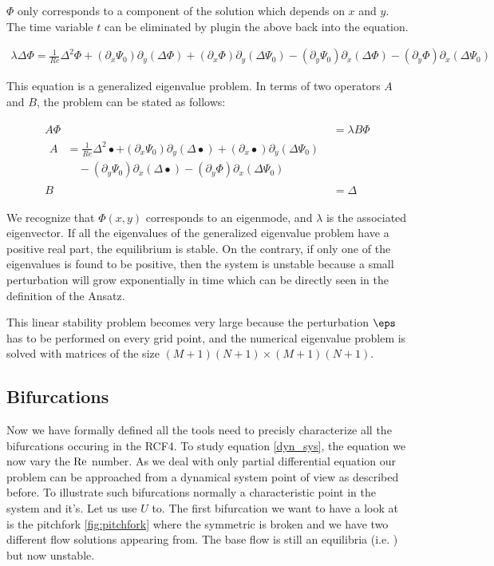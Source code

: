 $\Phi$ only corresponds to a component of the solution which depends on $x$ and
$y$. The time variable $t$ can be eliminated by plugin the above back into the
equation.

\begin{align}
\lambda \Delta \Phi = \frac{1}{Re} \Delta^2 \Phi
  + (\partial_x \Psi_0) \partial_y (\Delta \Phi)
  + (\partial_x \Phi) \partial_y (\Delta \Psi_0)
  - (\partial_y \Psi_0) \partial_x (\Delta \Phi)
  - (\partial_y \Phi) \partial_x (\Delta \Psi_0)
\label{eq:str_phi}
\end{align}

This equation is a generalized eigenvalue problem. In terms of two operators
$A$ and $B$, the problem can be stated as follows: 

\begin{align} \label{eq:eig_prob}
  \begin{split}
  A \Phi & = \lambda B \Phi \\[4pt]
  \begin{split}
  A & = \frac{1}{Re} \Delta^2 \bullet
    + (\partial_x \Psi_0) \partial_y (\Delta \bullet)
    + (\partial_x \bullet) \partial_y (\Delta \Psi_0) \\
    &\quad - (\partial_y \Psi_0) \partial_x (\Delta \bullet)
    - (\partial_y \Phi) \partial_x (\Delta \Psi_0)
  \end{split} \\
  B & = \Delta
  \end{split}
\end{align}

We recognize that $\Phi(x,y)$ corresponds to an eigenmode, and $\lambda$ is the
associated eigenvector. If all the eigenvalues of the generalized eigenvalue
problem have a positive real part, the equilibrium is stable. On the contrary,
if only one of the eigenvalues is found to be positive, then the system is
unstable because a small perturbation will grow exponentially in time which can
be directly seen in the definition of the Ansatz.

This linear stability problem becomes very large because the perturbation
$\eps$ has to be performed on every grid point, and the numerical eigenvalue
problem is solved with matrices of the size $(M+1)(N+1) \times (M+1)(N+1)$.

\subsection{Bifurcations}

Now we have formally defined all the tools need to precisly characterize all
the bifurcations occuring in the RCF4. To study equation \eqref{dyn_sys}, the
equation we now vary the $\mathrm{Re}$ number. As we deal with only partial
differential equation our problem can be approached from a dynamical system
point of view as described before. To illustrate such bifurcations normally a
characteristic point in the system and it's. Let us use $U$ to. The first
bifurcation we want to have a look at is the pitchfork \ref{fig:pitchfork}
where the symmetric is broken and we have two different flow solutions
appearing from. The base flow is still an equilibria (i.e. )  but now unstable.

